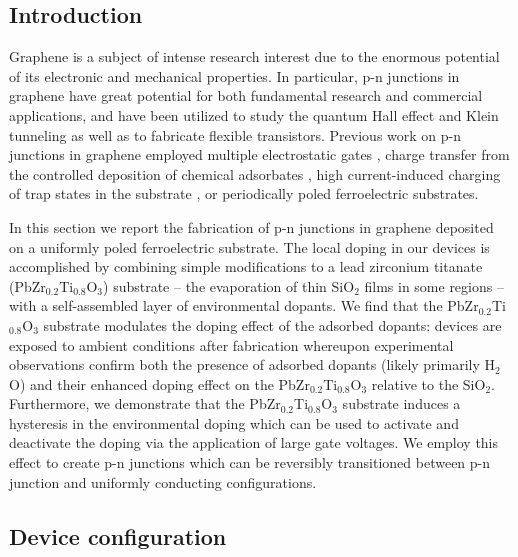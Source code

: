 \documentclass[edeposit,fullpage,draftthesis]{uiucthesis2009}
\begin{document}
    \subsection{Introduction}
    
        Graphene is a subject of intense research interest due to the enormous potential of its electronic and mechanical properties\cite{geim2007rise}. In particular, p-n junctions in graphene have great potential for both fundamental research and commercial applications, and have been utilized to study the quantum Hall effect \cite{Williams2007, Ozyilmaz2007, Velasco2010} and Klein tunneling\cite{Stander2009, Young2009} as well as to fabricate flexible transistors\cite{Kim2010}. Previous work on p-n junctions in graphene employed multiple electrostatic gates \cite{Meric2008, Williams2007, Ozyilmaz2007, Huard2007, Liu2008, Stander2009, Velasco2009, Velasco2010, Young2009}, charge transfer from the controlled deposition of chemical adsorbates \cite{Farmer2009,Lohmann2009,Brenner2010,Cheng2011,Sojoudi2012,Seo2014,Park2015}, high current-induced charging of trap states in the substrate \cite{Chiu2010}, or periodically poled ferroelectric substrates\cite{Baeumer2015}.

        In this section we report the fabrication of p-n junctions in graphene deposited on a uniformly poled ferroelectric substrate. The local doping in our devices is accomplished by combining simple modifications to a lead zirconium titanate (PbZr$_{0.2}$Ti$_{0.8}$O$_3$) substrate -- the evaporation of thin SiO$_2$ films in some regions -- with a self-assembled layer of environmental dopants. We find that the PbZr$_{0.2}$Ti$_{0.8}$O$_3$ substrate modulates the doping effect of the adsorbed dopants: devices are exposed to ambient conditions after fabrication whereupon experimental observations confirm both the presence of adsorbed dopants (likely primarily H$_2$O) and their enhanced doping effect on the PbZr$_{0.2}$Ti$_{0.8}$O$_3$ relative to the SiO$_2$.
        Furthermore, we demonstrate that the PbZr$_{0.2}$Ti$_{0.8}$O$_3$ substrate induces a hysteresis in the environmental doping which can be used to activate and deactivate the doping via the application of large gate voltages. We employ this effect to create p-n junctions which can be reversibly transitioned between p-n junction and uniformly conducting configurations.

    \subsection{Device configuration}
    
\end{document}
